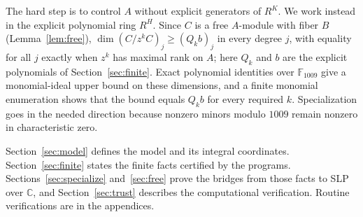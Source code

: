 \documentclass[11pt]{article}
\theoremstyle{definition}
\newcommand{\C}{\mathbb C}
\newcommand{\F}{\mathbb F}
\begin{document}
The hard step is to control $A$ without explicit generators of $R^K$.
We work instead in the explicit polynomial ring $R^H$. Since $C$ is a
free $A$-module with fiber $B$ (Lemma~\ref{lem:free}),
$\dim(C/z^kC)_j\geq(Q_kb)_j$ in every degree $j$, with equality for all
$j$ exactly when $z^k$ has maximal rank on $A$; here $Q_k$ and $b$ are
the explicit polynomials of Section~\ref{sec:finite}. Exact polynomial
identities over $\F_{1009}$ give a monomial-ideal upper bound on these
dimensions, and a finite monomial enumeration shows that the bound
equals $Q_kb$ for every required $k$. Specialization goes in the needed
direction because nonzero minors modulo $1009$ remain nonzero in
characteristic zero.

Section~\ref{sec:model} defines the model and its integral coordinates.
Section~\ref{sec:finite} states the finite facts certified by the
programs. Sections~\ref{sec:specialize} and~\ref{sec:free} prove the
bridges from those facts to SLP over $\C$, and
Section~\ref{sec:trust} describes the computational verification.
Routine verifications are in the appendices.
\end{document}
